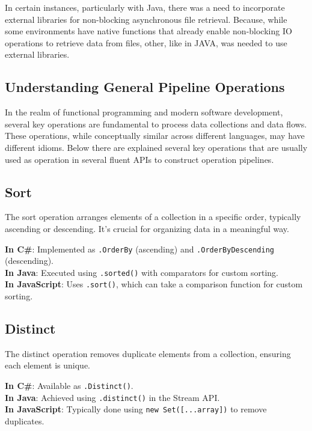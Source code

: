 In certain instances, particularly with Java, there was a need to incorporate external libraries for non-blocking asynchronous file retrieval. Because, while some environments have native functions that already enable non-blocking IO operations to retrieve data from files, other, like in JAVA, was needed to use external libraries.


\subsection{Understanding General Pipeline Operations}
\label{sec:understanding_pipeline_operations}

In the realm of functional programming and modern software development, several key operations are fundamental to process data collections and data flows. These operations, while conceptually similar across different languages, may have different idioms. Below there are explained several key operations that are usually used as operation in several fluent APIs to construct operation pipelines.  \cite{JAVASTREAMAPI} \cite{JSPROMISES} \cite{DOTNET_ASYNC_ENUM} \cite{LINQ}

\subsection*{Sort}
The sort operation arranges elements of a collection in a specific order, typically ascending or descending. It's crucial for organizing data in a meaningful way.

\textbf{In C\#}: Implemented as \texttt{.OrderBy} (ascending) and \texttt{.OrderByDescending} (descending). \\
\textbf{In Java}: Executed using \texttt{.sorted()} with comparators for custom sorting. \\
\textbf{In JavaScript}: Uses \texttt{.sort()}, which can take a comparison function for custom sorting.

\subsection*{Distinct}
The distinct operation removes duplicate elements from a collection, ensuring each element is unique.

\textbf{In C\#}: Available as \texttt{.Distinct()}. \\
\textbf{In Java}: Achieved using \texttt{.distinct()} in the Stream API. \\
\textbf{In JavaScript}: Typically done using \texttt{new Set([...array])} to remove duplicates.

